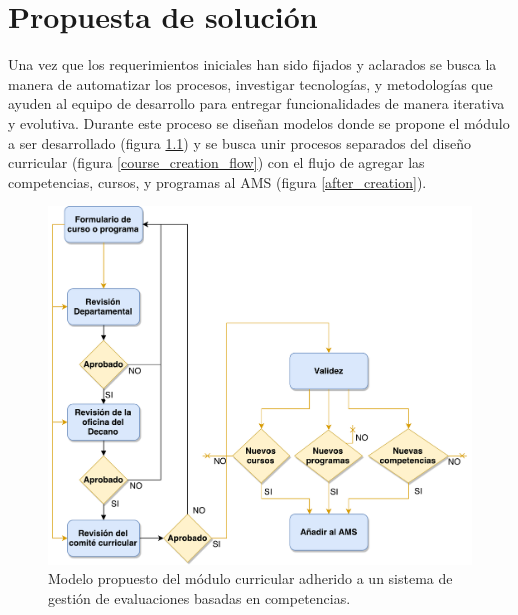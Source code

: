 \chapter{Propuesta de solución} %
\label{capitulo5} %
Una vez que los requerimientos iniciales han sido fijados y aclarados se busca la manera de automatizar los procesos, investigar tecnologías, y metodologías que ayuden al equipo de desarrollo para entregar funcionalidades de manera iterativa y evolutiva. Durante este proceso se diseñan modelos donde se propone el módulo a ser desarrollado (figura \ref{curriculum_model}) y se busca unir procesos separados del diseño curricular (figura \ref{course_creation_flow}) con el flujo de agregar las competencias, cursos, y programas al AMS (figura \ref{after_creation}).

\begin{figure}[H]
\centering
\includegraphics[scale=0.5]{Capitulos/PropuestadeSolucion/Imagenes/curriculum_model}
\caption{Modelo propuesto del módulo curricular adherido a un sistema de gestión de evaluaciones basadas en competencias.}
  \label{curriculum_model}
\end{figure}



